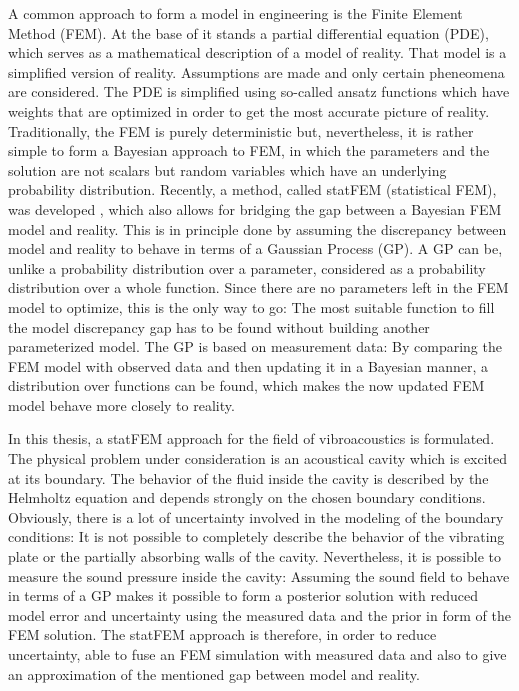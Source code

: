 \documentclass[%
  a4paper,oneside,%
  11pt,%
  smallchapters,
  style=printdev,
  extramargin,
  green,%
  rgb, <cmyk>
  ]{tubsbook}
\begin{document}
A common approach to form a model in engineering is the Finite Element Method (FEM). At the base of it stands a partial differential equation (PDE), which serves as a mathematical description of a model of reality. That model is a simplified version of reality. Assumptions are made and only certain pheneomena are considered. The PDE is simplified using so-called ansatz functions which have weights that are optimized in order to get the most accurate picture of reality. Traditionally, the FEM is purely deterministic but, nevertheless, it is rather simple to form a Bayesian approach to FEM, in which the parameters and the solution are not scalars but random variables which have an underlying probability distribution. 
Recently, a method, called statFEM (statistical FEM), was developed \cite{girolami2021}, which also allows for bridging the gap between a Bayesian FEM model and reality. This is in principle done by assuming the discrepancy between model and reality to behave in terms of a Gaussian Process (GP). A GP can be, unlike a probability distribution over a parameter, considered as a probability distribution over a whole function. Since there are no parameters left in the FEM model to optimize, this is the only way to go: The most suitable function to fill the model discrepancy gap has to be found without building another parameterized model. The GP is based on measurement data: By comparing the FEM model with observed data and then updating it in a Bayesian manner, a distribution over functions can be found, which makes the now updated FEM model behave more closely to reality.

In this thesis, a statFEM approach for the field of vibroacoustics is formulated. The physical problem under consideration is an acoustical cavity which is excited at its boundary. The behavior of the fluid inside the cavity is described by the Helmholtz equation and depends strongly on the chosen boundary conditions. Obviously, there is a lot of uncertainty involved in the modeling of the boundary conditions: It is not possible to completely describe the behavior of the vibrating plate or the partially absorbing walls of the cavity. Nevertheless, it is possible to measure the sound pressure inside the cavity: Assuming the sound field to behave in terms of a GP makes it possible to form a posterior solution with reduced model error and uncertainty using the measured data and the prior in form of the FEM solution. The statFEM approach is therefore, in order to reduce uncertainty, able to fuse an FEM simulation with measured data and also to give an approximation of the mentioned gap between model and reality.
\end{document}
